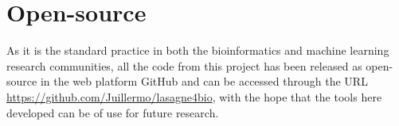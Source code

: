 



\section{Open-source}

As it is the standard practice in both the bioinformatics and machine learning research communities, all the code from this project has been released as open-source in the web platform GitHub and can be accessed through the URL \url{https://github.com/Juillermo/lasagne4bio}, with the hope that the tools here developed can be of use for future research.
